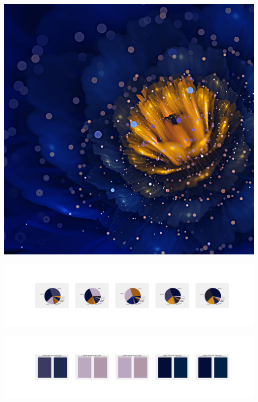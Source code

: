 \documentclass[11pt]{article}
\begin{document}
\begin{landscape}
    \begin{center}
    \includegraphics[width=\textwidth]{./nbimg/file (432).jpg}
    \end{center}

    \begin{center}
    \includegraphics[width=250mm]{./nbimg/pie-370.jpg}
    \end{center}

    \begin{center}
    \includegraphics[width=250mm]{./nbimg/peak-370.jpg}
    \end{center}
    


\end{landscape}
\end{document}
